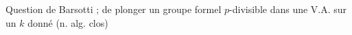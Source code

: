 
Question  de Barsotti ;   de plonger un groupe formel $p$-divisible dans une V.A. sur un $k$ donné (n. alg. clos)

